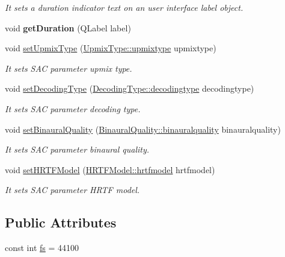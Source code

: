 \begin{DoxyCompactItemize}
\begin{DoxyCompactList}\small\item\em It sets a duration indicator text on an user interface label object. \end{DoxyCompactList}\item 
\mbox{\label{class_s_a_c_effects_ac446f6dfd009405c63a7ff702a7d9a6e}} 
void {\bfseries get\+Duration} (Q\+Label label)
\item 
void \hyperlink{class_s_a_c_effects_afd3f1f8b005595d4adf06d67c2bd556c}{set\+Upmix\+Type} (\hyperlink{struct_upmix_type_a6e154a570349b46c268b300b13d65daf}{Upmix\+Type\+::upmixtype} upmixtype)
\begin{DoxyCompactList}\small\item\em It sets S\+AC parameter upmix type. \end{DoxyCompactList}\item 
void \hyperlink{class_s_a_c_effects_a07d9b0135f5811a7b6e2d5d98c26fafe}{set\+Decoding\+Type} (\hyperlink{struct_decoding_type_a8b3854652406458753c9b7da2068b822}{Decoding\+Type\+::decodingtype} decodingtype)
\begin{DoxyCompactList}\small\item\em It sets S\+AC parameter decoding type. \end{DoxyCompactList}\item 
void \hyperlink{class_s_a_c_effects_aa0b1fa3cd01ea58fd6ae155dd3b12566}{set\+Binaural\+Quality} (\hyperlink{struct_binaural_quality_a3a009a287684c778dbb5507226cf24e4}{Binaural\+Quality\+::binauralquality} binauralquality)
\begin{DoxyCompactList}\small\item\em It sets S\+AC parameter binaural quality. \end{DoxyCompactList}\item 
void \hyperlink{class_s_a_c_effects_a9af83c6a63fcdf10e4bd849fa3c5973c}{set\+H\+R\+T\+F\+Model} (\hyperlink{struct_h_r_t_f_model_ae01efd7375e498a14624bbeebb93fa82}{H\+R\+T\+F\+Model\+::hrtfmodel} hrtfmodel)
\begin{DoxyCompactList}\small\item\em It sets S\+AC parameter H\+R\+TF model. \end{DoxyCompactList}\end{DoxyCompactItemize}
\subsection*{Public Attributes}
\begin{DoxyCompactItemize}
\item 
const int \hyperlink{class_s_a_c_effects_af9b20759f91e969aaa55f47f5aeecb37}{fs} = 44100
\end{DoxyCompactItemize}



